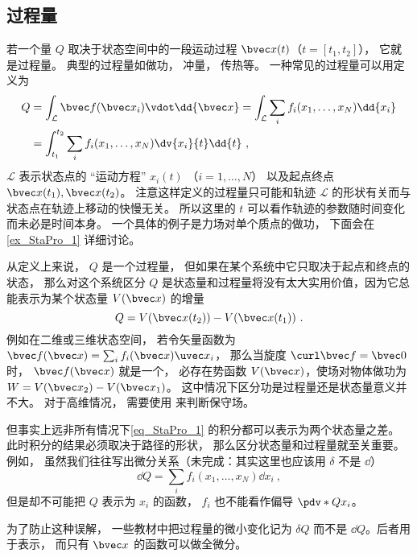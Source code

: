 \subsection{过程量}
若一个量 $Q$ 取决于状态空间中的一段运动过程 $\bvec x(t)$（$t = [t_1,t_2]$）， 它就是过程量。  典型的过程量如做功， 冲量， 传热等。 一种常见的过程量可以用定义为
\begin{equation}\label{eq_StaPro_1}
\begin{aligned}
Q &= \int_{\mathcal L} \bvec f(\bvec x_i) \vdot \dd{\bvec x} = \int_{\mathcal L} \sum_i f_i(x_1, \dots, x_N) \dd{x_i}\\
&= \int_{t_1}^{t_2} \sum_i f_i(x_1, \dots, x_N) \dv{x_i}{t} \dd{t}~,
\end{aligned}
\end{equation}
$\mathcal L$ 表示状态点的 “运动方程” $x_i(t)$ （$i = 1,\dots, N$） 以及起点终点 $\bvec x(t_1), \bvec x(t_2)$。 注意这样定义的过程量只可能和轨迹 $\mathcal L$ 的形状有关而与状态点在轨迹上移动的快慢无关。 所以这里的 $t$ 可以看作轨迹的参数随时间变化而未必是时间本身。 一个具体的例子是力场对单个质点的做功， 下面会在\autoref{ex_StaPro_1} 详细讨论。


从定义上来说， $Q$ 是一个过程量， 但如果在某个系统中它只取决于起点和终点的状态， 那么对这个系统区分 $Q$ 是状态量和过程量将没有太大实用价值，因为它总能表示为某个状态量 $V(\bvec x)$ 的增量
\begin{equation}
Q = V(\bvec x(t_2)) - V(\bvec x(t_1))~.
\end{equation}
例如在二维或三维状态空间， 若令矢量函数为 $\bvec f(\bvec x) = \sum_i f_i(\bvec x) \uvec x_i$， 那么当旋度 $\curl \bvec f = \bvec 0$ 时， $\bvec f(\bvec x)$ 就是一个， 必存在势函数 $V(\bvec x)$，使场对物体做功为 $W = V(\bvec x_2) - V(\bvec x_1)$。 这中情况下区分功是过程量还是状态量意义并不大。 对于高维情况， 需要使用 来判断保守场。

但事实上远非所有情况下\autoref{eq_StaPro_1} 的积分都可以表示为两个状态量之差。 此时积分的结果必须取决于路径的形状， 那么区分状态量和过程量就至关重要。 例如， 虽然我们往往写出微分关系（未完成：其实这里也应该用 $\delta$ 不是 $\dd{}$）
\begin{equation}
\dd Q = \sum_i f_i(x_1, \dots, x_N) \dd{x_i}~,
\end{equation}
但是却不可能把 $Q$ 表示为 $x_i$ 的函数， $f_i$ 也不能看作偏导 $\pdv*{Q}{x_i}$。

为了防止这种误解， 一些教材中把过程量的微小变化记为 $\delta Q$ 而不是 $\dd Q$。后者用于表示， 而只有 $\bvec x$ 的函数可以做全微分。

